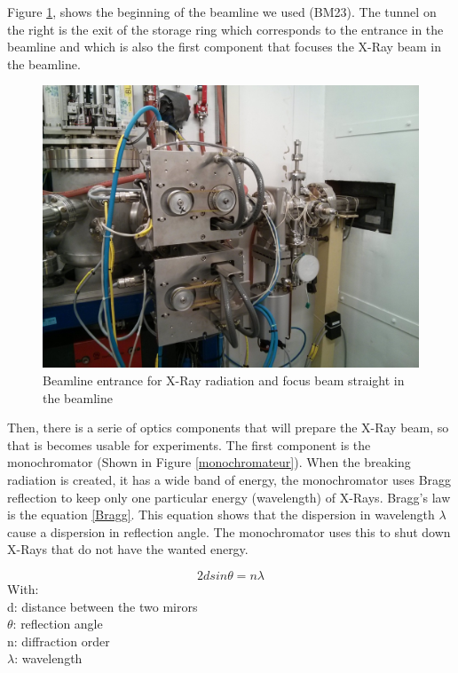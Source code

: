 \documentclass[11pt,a4paper,oneside]{report}
\begin{document}
Figure \ref{Incident}, shows the beginning of the beamline we used (BM23). The tunnel on the right is the exit of the  storage ring which corresponds to the entrance in the beamline and which is also the first component that focuses the X-Ray beam in the beamline.

\begin{figure}[H]
    \begin{center}
        \includegraphics[scale=0.13]{Images/IMG_20151210_202655.jpg}
        \caption{Beamline entrance for X-Ray radiation and focus beam straight in the beamline}
        \label{Incident}
    \end{center}
\end{figure}


Then, there is a serie of optics components that will prepare the X-Ray beam, so that is becomes usable for experiments. The first component is the monochromator (Shown in Figure \ref{monochromateur}). When the breaking radiation is created, it has a wide band of energy, the monochromator uses Bragg reflection to keep only one particular energy (wavelength) of X-Rays. Bragg's law is the equation \ref{Bragg}. This equation shows that the dispersion in wavelength $\lambda$ cause a dispersion in reflection angle. The monochromator uses this to shut down X-Rays that do not have the wanted energy.

\begin{equation}
    2d sin \theta = n \lambda  \label{Bragg}
\end{equation}
With:\\
d: distance between the two mirors\\
$\theta$: reflection angle\\
n: diffraction order\\
$\lambda$: wavelength\\
\end{document}
